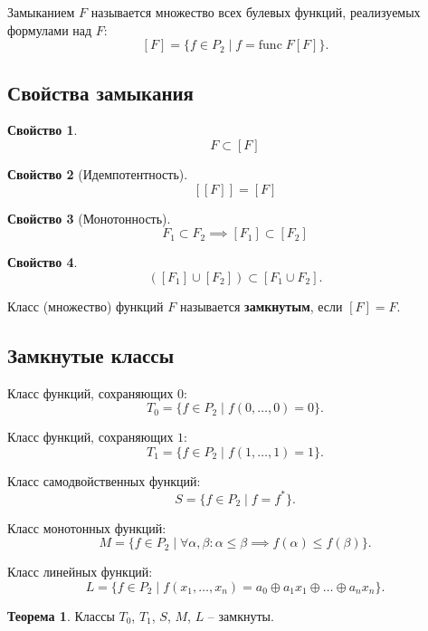 \documentclass[a5paper, 11pt]{extarticle}
\theoremstyle{definition}
\newtheorem*{theorem*}{Теорема}
\newtheorem{property}{Свойство}[subsection]
\theoremstyle{definition}
\theoremstyle{definition}
\numberwithin{figure}{section}
\numberwithin{table}{section}
\begin{document}
Замыканием \(F\) называется множество всех булевых функций, реализуемых формулами над \(F\):
\[
    [F] = \{f \in P_2 \mid f = \text{func} \; F [F]\}.
\]

\subsection{Свойства замыкания}

\begin{property}
    \[
        F \subset [F]
    \]
\end{property}

\begin{property}[Идемпотентность]
    \[
        [[F]] = [F]
    \]
\end{property}

\begin{property}[Монотонность]
    \[
        F_1 \subset F_2 \implies [F_1] \subset [F_2]
    \]
\end{property}

\begin{property}
    \[
        ([F_1] \cup [F_2]) \subset [F_1 \cup F_2].
    \]
\end{property}

Класс (множество) функций \(F\) называется \textbf{замкнутым}, если \([F] = F\).

\subsection{Замкнутые классы}

Класс функций, сохраняющих \(0\):
\[
    T_0 = \{f \in P_2 \mid f(0, \ldots, 0) = 0\}.
\]

Класс функций, сохраняющих \(1\):
\[
    T_1 = \{f \in P_2 \mid f(1, \ldots, 1) = 1\}.
\]

Класс самодвойственных функций:
\[
    S = \{f \in P_2 \mid f = f^*\}.
\]

Класс монотонных функций:
\[
    M = \{f \in P_2 \mid \forall \alpha, \beta : \alpha \leq \beta \implies f(\alpha) \leq f(\beta)\}.
\]

Класс линейных функций:
\[
    L = \{f \in P_2 \mid f(x_1, \ldots, x_n) = a_0 \oplus a_1 x_1 \oplus \ldots \oplus a_n x_n\}.
\]

\begin{theorem*}
    Классы \(T_0\), \(T_1\), \(S\), \(M\), \(L\) -- замкнуты.
\end{theorem*}
\end{document}
